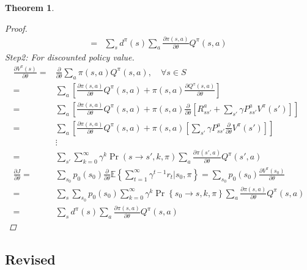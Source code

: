 \documentclass[a4paper]{article}
\newtheorem{theorem}{Theorem}
\begin{document}
\begin{theorem}
\begin{proof}
\begin{align*}
            =& \sum^{}_{s} d^\pi(s) \sum^{}_{a} \frac{\partial{\pi(s,a)}}{\partial{\theta}} Q^\pi(s,a)
        \end{align*}
    Step2: For discounted policy value.
        \begin{align*}
            \frac{\partial{V^\pi(s)}}{\partial{\theta}}
            =& \frac{\partial{}}{\partial{\theta}} \sum^{}_{a} \pi(s,a) Q^\pi(s,a), \quad \forall s \in S\\
            =& \sum^{}_{a} \left[ \frac{\partial{\pi(s,a)}}{\partial{\theta}} Q^\pi(s,a) + \pi(s,a) \frac{\partial{Q^\pi(s,a)}}{\partial{\theta}}  \right]\\
            =& \sum^{}_{a} \left[ \frac{\partial{\pi(s,a)}}{\partial{\theta}} Q^\pi(s,a) + \pi(s,a) \frac{\partial{}}{\partial{\theta}} \left[ R^a_{ss'} + \sum^{}_{s'} \gamma P^a_{ss'} V^\pi(s') \right]  \right]\\
            =& \sum^{}_{a} \left[ \frac{\partial{\pi(s,a)}}{\partial{\theta}} Q^\pi(s,a) + \pi(s,a) \left[ \sum^{}_{s'} \gamma P^a_{ss'} \frac{\partial{}}{\partial{\theta}} V^\pi(s') \right]  \right]\\
             &\vdots\\
            =& \sum^{}_{s'} \sum^{\infty}_{k=0} \gamma^k \Pr(s\rightarrow s', k, \pi) \sum^{}_{a} \frac{\partial{\pi(s',a)}}{\partial{\theta}} Q^\pi(s',a)\\
            \frac{\partial{J}}{\partial{\theta}} 
            =& \sum^{}_{s_0} p_0(s_0)\frac{\partial{}}{\partial{\theta}} \mathbb{E} \left\{ \sum^{\infty}_{t=1} \gamma^{t-1} r_t | s_0, \pi \right\}
            = \sum^{}_{s_0} p_0(s_0)\frac{\partial{V^\pi(s_0)}}{\partial{\theta}} \\
            =& \sum^{}_{s} \sum^{}_{s_0} p_0(s_0) \sum^{\infty}_{k=0} \gamma^k  \Pr \left\{ s_0 \rightarrow s, k, \pi \right\}
            \sum^{}_{a} \frac{\partial{\pi(s,a)}}{\partial{\theta}} Q^\pi(s,a)\\
            =& \sum^{}_{s} d^\pi(s) \sum^{}_{a} \frac{\partial{\pi(s,a)}}{\partial{\theta}} Q^\pi(s,a)
        \end{align*}
    \end{proof}
\end{theorem}

\subsection{Revised}%
\label{sub:revised}
\end{document}
